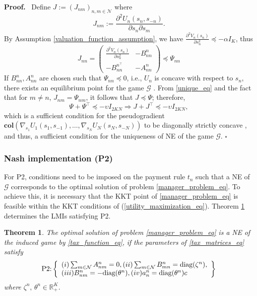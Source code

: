 \documentclass[twocolumn]{autart}
\newtheorem{theorem}{Theorem}
\newenvironment{proof}[1][Proof]{%
  \par\noindent\textbf{#1.}\ }{%
  \hfill$\square$\par
}
\begin{document}
\begin{proof}
Define $J:=(J_{nm})_{n,m\in\mathcal{N}}$ where
\[
J_{nm}:=\frac{\partial^2 U_n(s_n,s_{-n})}{\partial s_n \partial s_m}.
\]
By Assumption \ref{valuation_function_assumption}, we have $\frac{\partial^2 V_n(s_n)}{\partial s_n^2}\preceq -\alpha I_K$, thus
\begin{equation}\label{unique_eq}
     J_{nn}=
     \begin{pmatrix}
        \frac{\partial^2 V_n(s_n)}{\partial s_n^2} & -B_{nn}^n\\
        -B_{nn}^{n^\top}& -A_{nn}^n
    \end{pmatrix}\preceq 
    \Psi_{nn}
\end{equation}
If $B_{nn}^n, A_{nn}^n$ are chosen such that
$\Psi_{nn}\preceq 0$, i.e., $U_n$ is concave with respect to $s_n$, there exists an equilibrium point for the game $\mathcal{G}$ \cite[Theorem 1]{rosen1965existence}.  
From \eqref{unique_eq} and the fact that for $m\neq n$, $J_{nm}=\Psi_{nm}$, it follows that $J\preceq \Psi$; therefore, 
\[\Psi+\Psi^\top\preceq -\upsilon I_{2KN} \Rightarrow J+J^\top\preceq -\upsilon I_{2KN},\]
which is a sufficient condition for the pseudogradient $\textbf{col}(\nabla_{s_1}U_1(s_1, s_{-1}), \ldots, \nabla_{s_N}U_N(s_N, s_{-N}))$ to be diagonally strictly concave \cite[Theorem 6]{rosen1965existence}, and thus, a sufficient condition for the uniqueness of NE of the game $\mathcal{G}$.
\end{proof}
\subsubsection{Nash implementation (P2)}
For P2, conditions need to be imposed on the payment rule $t_n$ such that a NE of $\mathcal{G}$ corresponds to the optimal solution of problem \eqref{manager_problem_eq}. To achieve this, it is necessary that the KKT point of \eqref{manager_problem_eq} is feasible within the KKT conditions of (\ref{utility_maximization_eq}). Theorem \ref{nash_implementation_theorem} determines the LMIs satisfying P2.
\begin{theorem}\label{nash_implementation_theorem}
	The optimal solution of problem \eqref{manager_problem_eq} is a NE of the induced game by \eqref{tax_function_eq}, if the parameters of \eqref{tax_matrices_eq} satisfy
	\begin{equation}\label{nash_implementation_cond_eq}
	\textnormal{P2:}\left\{\begin{array}{l}
		(\romannumeral 1) \sum_{m\in\mathcal{N}}{A_{nm}^n}=0, (\romannumeral 2) \sum_{m\in\mathcal{N}}{B_{mn}^n} = \text{diag}(\zeta^{n}),\\
		(\romannumeral 3) B_{nm}^n=-\text{diag}(\theta^{n}), (\romannumeral 4) a_n^{n}=\text{diag}(\theta^{n})c
		\end{array}\right\}
	\end{equation}
 where $\zeta^{n}, \, \theta^n\in\mathbb{R}_+^{K}$.
\end{theorem}
\end{document}
